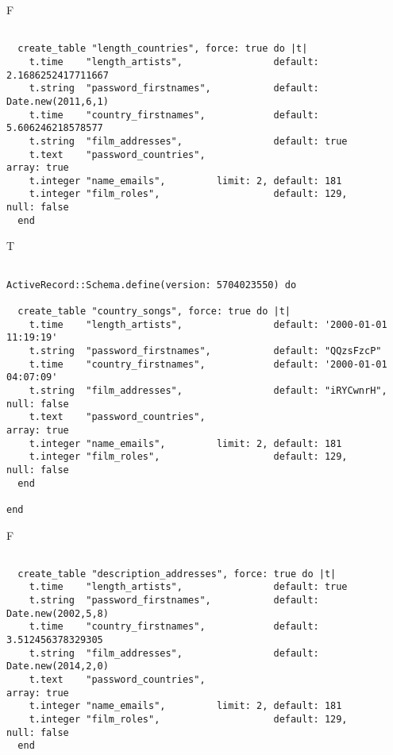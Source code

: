 F
\begin{verbatim}

  create_table "length_countries", force: true do |t|
    t.time    "length_artists",                default: 2.1686252417711667
    t.string  "password_firstnames",           default: Date.new(2011,6,1)
    t.time    "country_firstnames",            default: 5.606246218578577
    t.string  "film_addresses",                default: true
    t.text    "password_countries",                                                         array: true
    t.integer "name_emails",         limit: 2, default: 181
    t.integer "film_roles",                    default: 129,                   null: false
  end

\end{verbatim}

T
\begin{verbatim}

ActiveRecord::Schema.define(version: 5704023550) do

  create_table "country_songs", force: true do |t|
    t.time    "length_artists",                default: '2000-01-01 11:19:19'
    t.string  "password_firstnames",           default: "QQzsFzcP"
    t.time    "country_firstnames",            default: '2000-01-01 04:07:09'
    t.string  "film_addresses",                default: "iRYCwnrH",            null: false
    t.text    "password_countries",                                                         array: true
    t.integer "name_emails",         limit: 2, default: 181
    t.integer "film_roles",                    default: 129,                   null: false
  end

end
\end{verbatim}


F
\begin{verbatim}

  create_table "description_addresses", force: true do |t|
    t.time    "length_artists",                default: true
    t.string  "password_firstnames",           default: Date.new(2002,5,8)
    t.time    "country_firstnames",            default: 3.512456378329305
    t.string  "film_addresses",                default: Date.new(2014,2,0)
    t.text    "password_countries",                                                         array: true
    t.integer "name_emails",         limit: 2, default: 181
    t.integer "film_roles",                    default: 129,                   null: false
  end

\end{verbatim}

